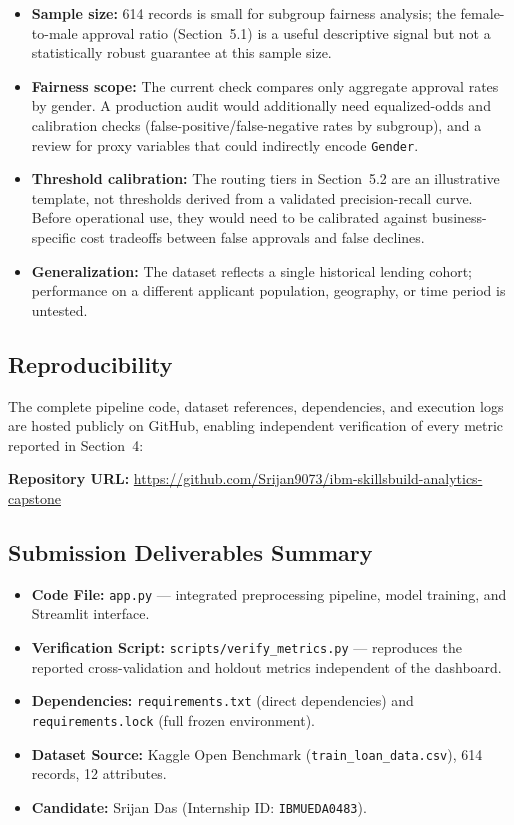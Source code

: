 \documentclass[11pt,a4paper]{article}
\begin{document}
\begin{itemize}
    \item \textbf{Sample size:} 614 records is small for subgroup fairness analysis; the female-to-male approval ratio (Section~5.1) is a useful descriptive signal but not a statistically robust guarantee at this sample size.
    \item \textbf{Fairness scope:} The current check compares only aggregate approval rates by gender. A production audit would additionally need equalized-odds and calibration checks (false-positive/false-negative rates by subgroup), and a review for proxy variables that could indirectly encode \texttt{Gender}.
    \item \textbf{Threshold calibration:} The routing tiers in Section~5.2 are an illustrative template, not thresholds derived from a validated precision-recall curve. Before operational use, they would need to be calibrated against business-specific cost tradeoffs between false approvals and false declines.
    \item \textbf{Generalization:} The dataset reflects a single historical lending cohort; performance on a different applicant population, geography, or time period is untested.
\end{itemize}

\subsection{Reproducibility}
The complete pipeline code, dataset references, dependencies, and execution logs are hosted publicly on GitHub, enabling independent verification of every metric reported in Section~4:

\begin{center}
    \textbf{Repository URL:} \url{https://github.com/Srijan9073/ibm-skillsbuild-analytics-capstone}
\end{center}

\subsection{Submission Deliverables Summary}
\begin{itemize}
    \item \textbf{Code File:} \texttt{app.py} --- integrated preprocessing pipeline, model training, and Streamlit interface.
    \item \textbf{Verification Script:} \texttt{scripts/verify\_metrics.py} --- reproduces the reported cross-validation and holdout metrics independent of the dashboard.
    \item \textbf{Dependencies:} \texttt{requirements.txt} (direct dependencies) and \texttt{requirements.lock} (full frozen environment).
    \item \textbf{Dataset Source:} Kaggle Open Benchmark (\texttt{train\_loan\_data.csv}), 614 records, 12 attributes.
    \item \textbf{Candidate:} Srijan Das (Internship ID: \texttt{IBMUEDA0483}).
\end{itemize}
\end{document}
